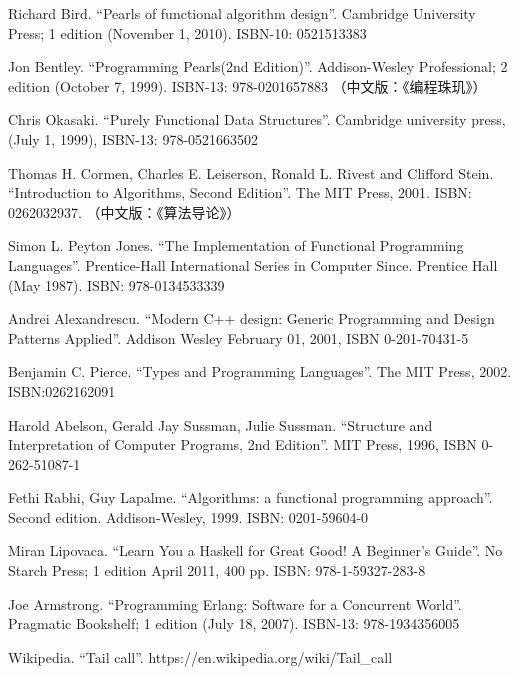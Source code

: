 \documentclass[UTF8]{article}
\begin{document}
\begin{thebibliography}{99}


Richard Bird. ``Pearls of functional algorithm design''. Cambridge University Press; 1 edition (November 1, 2010). ISBN-10: 0521513383

Jon Bentley. ``Programming Pearls(2nd Edition)''. Addison-Wesley Professional; 2 edition (October 7, 1999). ISBN-13: 978-0201657883 （中文版：《编程珠玑》）

Chris Okasaki. ``Purely Functional Data Structures''. Cambridge university press, (July 1, 1999), ISBN-13: 978-0521663502

Thomas H. Cormen, Charles E. Leiserson, Ronald L. Rivest and Clifford Stein. ``Introduction to Algorithms, Second Edition''. The MIT Press, 2001. ISBN: 0262032937. （中文版：《算法导论》）


Simon L. Peyton Jones. ``The Implementation of Functional Programming Languages''. Prentice-Hall International Series in Computer Since. Prentice Hall (May 1987). ISBN: 978-0134533339

Andrei Alexandrescu. ``Modern C++ design: Generic Programming and Design Patterns Applied''. Addison Wesley February 01, 2001, ISBN 0-201-70431-5

Benjamin C. Pierce. ``Types and Programming Languages''. The MIT Press, 2002. ISBN:0262162091

Harold Abelson, Gerald Jay Sussman, Julie Sussman. ``Structure and Interpretation of Computer Programs, 2nd Edition''. MIT Press, 1996, ISBN 0-262-51087-1

Fethi Rabhi, Guy Lapalme. ``Algorithms: a functional programming approach''. Second edition. Addison-Wesley, 1999. ISBN: 0201-59604-0

Miran Lipovaca. ``Learn You a Haskell for Great Good! A Beginner's Guide''. No Starch Press; 1 edition April 2011, 400 pp. ISBN: 978-1-59327-283-8

Joe Armstrong. ``Programming Erlang: Software for a Concurrent World''. Pragmatic Bookshelf; 1 edition (July 18, 2007). ISBN-13: 978-1934356005

Wikipedia. ``Tail call''. https://en.wikipedia.org/wiki/Tail\_call


\end{thebibliography}
\end{document}
